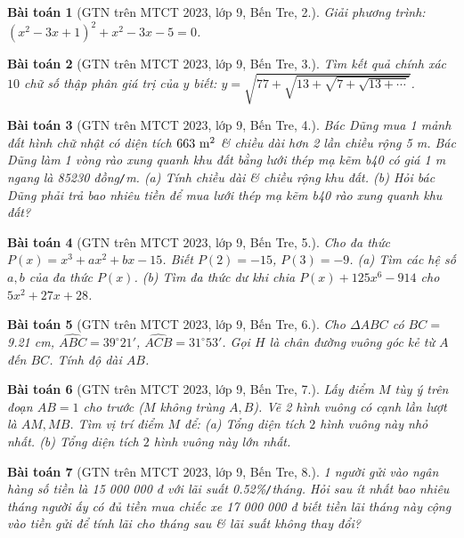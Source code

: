 \documentclass{article}
\newtheorem{baitoan}{Bài toán}
\begin{document}
\begin{baitoan}[GTN trên MTCT 2023, lớp 9, Bến Tre, 2.]
	Giải phương trình: $(x^2 - 3x + 1)^2 + x^2 - 3x - 5 = 0$.
\end{baitoan}

\begin{baitoan}[GTN trên MTCT 2023, lớp 9, Bến Tre, 3.]
	Tìm kết quả chính xác $10$ chữ số thập phân giá trị của $y$ biết: $y = \sqrt{77 + \sqrt{13 + \sqrt{7 + \sqrt{13 + \cdots}}}}$.
\end{baitoan}

\begin{baitoan}[GTN trên MTCT 2023, lớp 9, Bến Tre, 4.]
	Bác Dũng mua 1 mảnh đất hình chữ nhật có diện tích $\rm663\ m^2$ \& chiều dài hơn 2 lần chiều rộng \emph{5 m}. Bác Dũng làm 1 vòng rào xung quanh khu đất bằng lưới thép mạ kẽm b40 có giá \emph{1 m} ngang là \emph{85230 đồng\texttt{/}m}. (a) Tính chiều dài \& chiều rộng khu đất. (b) Hỏi bác Dũng phải trả bao nhiêu tiền để mua lưới thép mạ kẽm b40 rào xung quanh khu đất? 
\end{baitoan}

\begin{baitoan}[GTN trên MTCT 2023, lớp 9, Bến Tre, 5.]
	Cho đa thức $P(x) = x^3 + ax^2 + bx - 15$. Biết $P(2) = -15$, $P(3) = -9$. (a) Tìm các hệ số $a,b$ của đa thức $P(x)$. (b) Tìm đa thức dư khi chia $P(x) + 125x^6 - 914$ cho $5x^2 + 27x + 28$.
\end{baitoan}

\begin{baitoan}[GTN trên MTCT 2023, lớp 9, Bến Tre, 6.]
	Cho $\Delta ABC$ có $BC =$ \emph{9.21 cm}, $\widehat{ABC} = 39^\circ21'$, $\widehat{ACB} = 31^\circ53'$. Gọi $H$ là chân đường vuông góc kẻ từ $A$ đến $BC$. Tính độ dài $AB$.
\end{baitoan}

\begin{baitoan}[GTN trên MTCT 2023, lớp 9, Bến Tre, 7.]
	Lấy điểm $M$ tùy ý trên đoạn $AB = 1$ cho trước ($M$ không trùng $A,B$). Vẽ 2 hình vuông có cạnh lần lượt là $AM,MB$. Tìm vị trí điểm $M$ để: (a) Tổng diện tích $2$ hình vuông này nhỏ nhất. (b) Tổng diện tích $2$ hình vuông này lớn nhất.
\end{baitoan}

\begin{baitoan}[GTN trên MTCT 2023, lớp 9, Bến Tre, 8.]
	1 người gửi vào ngân hàng số tiền là \emph{15 000 000 đ} với lãi suất \emph{0.52\%\texttt{/}tháng}. Hỏi sau ít nhất bao nhiêu tháng người ấy có đủ tiền mua chiếc xe \emph{17 000 000 đ} biết tiền lãi tháng này cộng vào tiền gửi để tính lãi cho tháng sau \& lãi suất không thay đổi? 
\end{baitoan}
\end{document}
